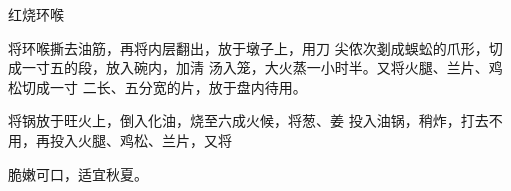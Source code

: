\begin{recipe}{红烧环喉}

\ingredients


\cooking

\step 	将环喉撕去油筋，再将内层翻出，放于墩子上，用刀 尖侬次剗成蜈蚣的爪形，切成一寸五的段，放入碗内，加淸 汤入笼，大火蒸一小时半。又将火腿、兰片、鸡松切成一寸 二长、五分宽的片，放于盘内待用。

\step 	将锅放于旺火上，倒入化油，烧至六成火候，将葱、姜 投入油锅，稍炸，打去不用，再投入火腿、鸡松、兰片，又将

\notes

脆嫩可口，适宜秋夏。

\end{recipe}

